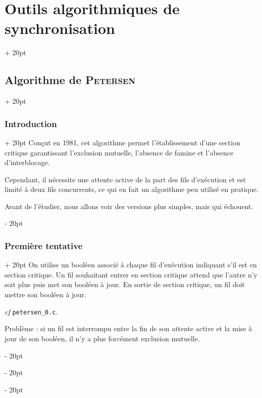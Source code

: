 \documentclass[a4paper, 12pt, twoside]{article}
\newcommand{\ind}[1][20pt]{\advance\leftskip + #1}
\newcommand{\deind}[1][20pt]{\advance\leftskip - #1}
\newenvironment{indt}[2][20pt]{#2 \par \ind[#1]}{\par \deind} %
\begin{document}
    \begin{indt}{\section{Outils algorithmiques de synchronisation}}
        \begin{indt}{\subsection{Algorithme de \textsc{Petersen}}}
            \begin{indt}{\subsubsection{Introduction}}
                Conçut en 1981, cet algorithme permet l'établissement d'une section critique garantissant l'exclusion mutuelle, l'absence de famine et l'absence d'interblocage.

                Cependant, il nécessite une attente active de la part des fils d'exécution et est limité à deux fils concurrents, ce qui en fait un algorithme peu utilisé en pratique.

                Avant de l'étudier, nous allons voir des versions plus simples, mais qui échouent.
            \end{indt}

            \vspace{12pt}
            
            \begin{indt}{\subsubsection{Première tentative}}
                On utilise un booléen associé à chaque fil d'exécution indiquant s'il est en section critique.
                Un fil souhaitant entrer en section critique attend que l'autre n'y soit plus puis met son booléen à jour.
                En sortie de section critique, un fil doit mettre son booléen à jour.

                \textit{cf} \texttt{petersen\_0.c}.

                Problème : si un fil est interrompu entre la fin de son attente active et la mise à jour de son booléen, il n'y a plus forcément exclusion mutuelle.
            \end{indt}

            \vspace{12pt}
            

\end{indt}
\end{indt}
\end{document}
